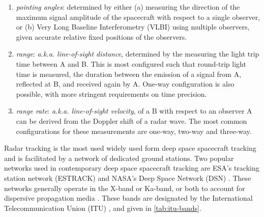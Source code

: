 \begin{enumerate}
    \item \textit{pointing angles}: determined by either (a) measuring the
    direction of the maximum signal amplitude of the spacecraft with respect to
    a single observer, or (b) Very Long Baseline Interferometry (VLBI) using
    multiple observers, given accurate relative fixed positions of the
    observers.
    \item \textit{range}: \textit{a.k.a. line-of-sight distance}, determined by
    the measuring the light trip time between A and B. This is most configured
    such that round-trip light time is measured, the duration between the
    emission of a signal from A, reflected at B, and received again by A.
    One-way configuration is also possible, with more stringent requirements on
    time precision.
    \item \textit{range rate}: \textit{a.k.a. line-of-sight velocity}, of
    a B with respect to an observer A can be derived from the Doppler shift
    of a radar wave. The most common configurations for these measurements are
    one-way, two-way and three-way.
\end{enumerate}

Radar tracking is the most used widely used form deep space spacecraft tracking
and is facilitated by a network of dedicated ground stations. Two popular
networks used in contemporary deep space spacecraft tracking are ESA's tracking
station network (ESTRACK) \cite{Doat2018} and NASA's Deep Space Network (DSN)
\cite{Dsn2015}. These networks generally operate in the X-band or Ka-band, or
both to account for dispersive propagation media \cite{Bertotti1993}. These
bands are designated by the International Telecommunication Union (ITU)
\cite{Berner2020}, and given in \autoref{tab:itu-bands}.

